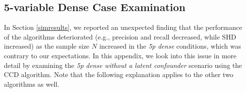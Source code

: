 \documentclass[twoside, 11pt]{article}
\newcommand*{\figref}[2][]{%
  \hyperref[{fig:#2}]{%
    Figure~\ref*{fig:#2}%
    \ifx\\#1\\%
    \else
      #1%
    \fi
  }%
}
\begin{document}
\begin{appendices}


\section{5-variable Dense Case Examination}\label{5pdenseexam}

In Section \ref{simresults}, we reported an unexpected finding that the performance of the algorithms deteriorated (e.g., precision and recall decreased, while SHD increased) as the sample size $N$ increased in the \textit{5p dense} conditions, which was contrary to our expectations. 
In this appendix, we look into this issue in more detail by examining the \textit{5p dense without a latent confounder} scenario using the CCD algorithm. Note that the following explanation applies to the other two algorithms as well.



\end{appendices}
\end{document}
